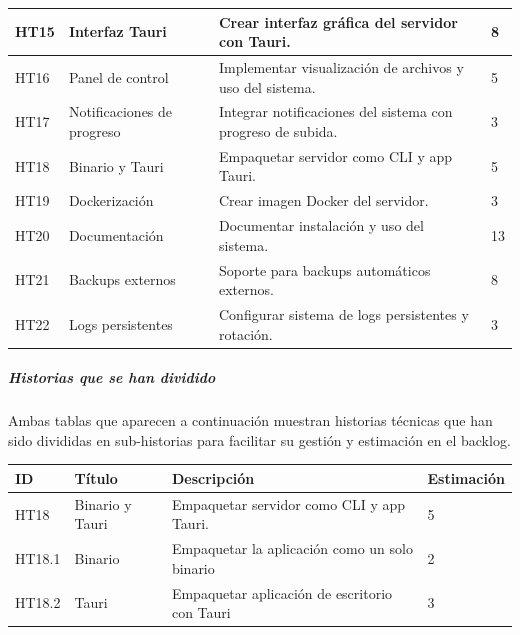 \begin{tabularx}{\textwidth}{|l|l|>{\raggedright\arraybackslash}X|l|}
    HT15 & Interfaz Tauri & Crear interfaz gráfica del servidor con Tauri. & 8 \\
    \hline
    HT16 & Panel de control & Implementar visualización de archivos y uso del sistema. & 5 \\
    \hline
    HT17 & Notificaciones de progreso & Integrar notificaciones del sistema con progreso de subida. & 3 \\
    \hline
    HT18 & Binario y Tauri & Empaquetar servidor como CLI y app Tauri. & 5 \\
    \hline
    HT19 & Dockerización & Crear imagen Docker del servidor. & 3 \\
    \hline
    HT20 & Documentación & Documentar instalación y uso del sistema. & 13 \\
    \hline
    HT21 & Backups externos & Soporte para backups automáticos externos. & 8 \\
    \hline
    HT22 & Logs persistentes & Configurar sistema de logs persistentes y rotación. & 3 \\
    \hline
\end{tabularx}

\subparagraph{Historias que se han dividido}

Ambas tablas que aparecen a continuación muestran historias técnicas que han sido divididas en sub-historias para facilitar su gestión y estimación en el backlog.

\begin{table}[h!]
    \begin{center}
        \begin{tabularx}{\textwidth}{|l|l|>{\raggedright}X|l|}
            \hline
            ID & Título & Descripción & Estimación \\
            \hline
            HT18 & Binario y Tauri & Empaquetar servidor como CLI y app Tauri. & 5 \\
            \hline
            HT18.1 & Binario & Empaquetar la aplicación como un solo binario & 2 \\
            \hline
            HT18.2 & Tauri & Empaquetar aplicación de escritorio con Tauri & 3 \\
            \hline
        \end{tabularx}
    \end{center}
\end{table}

